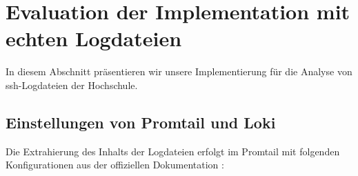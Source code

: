 \section{Evaluation der Implementation mit echten Logdateien}
In diesem Abschnitt präsentieren wir unsere Implementierung für die Analyse von \gls{ssh}-Logdateien der Hochschule. 





\subsection{Einstellungen von Promtail und Loki}
Die Extrahierung des Inhalts der Logdateien erfolgt im Promtail mit folgenden Konfigurationen aus der offiziellen Dokumentation \citep{Grafana_ConfigPromtail}:
